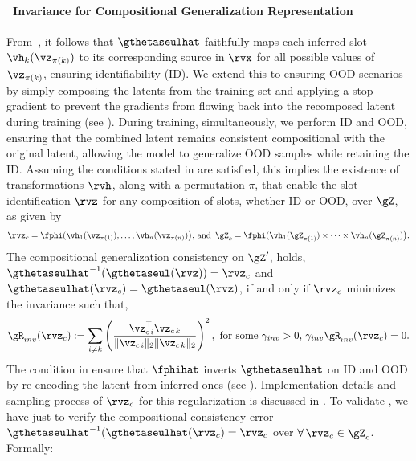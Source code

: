 \documentclass{article} %
\theoremstyle{plain}
\theoremstyle{definition}
\theoremstyle{remark}
\numberwithin{equation}{section}
\begin{document}
\paragraph{\ Invariance for Compositional Generalization Representation}
From~, it follows that \(\gthetaseulhat\) faithfully maps each inferred slot \(\vh_{k}(\vz_{\pi(k)})\) to its corresponding source in \(\rvx\) for all possible values of \(\vz_{\pi(k)}\), ensuring identifiability (ID). We extend this to ensuring OOD scenarios by simply composing the latents from the training set and applying a stop gradient to prevent the gradients from flowing back into the recomposed latent during training (see ). During training, simultaneously, we perform ID and OOD, ensuring that the combined latent remains consistent \ie compositional with the original latent, allowing the model to generalize OOD samples while retaining the ID.
Assuming the conditions stated in  are satisfied, this implies the existence of transformations \(\rvh\), along with a permutation \(\pi\), that enable the slot-identification $\rvz$ for any composition of slots, whether ID or OOD, over $\gZ$, as given by
\begin{equation}\label{eq:support_permutation}
    \rvz_{c} = \fphi( \vh_{1}(\vz_{\pi(1)}), \ldots, \vh_{n}(\vz_{\pi(n)}) \big),\, \text{and }\,
    \gZ_c = \fphi( \vh_{1}(\gZ_{\pi(1)})\times \cdots \times \vh_{n}(\gZ_{\pi(n)}) \big).
\end{equation}
The compositional generalization consistency on $\gZ'$, holds, \ie $\gthetaseulhat^{-1}(\gthetaseul(\rvz)) = \rvz_{c} $ and $\gthetaseulhat(\rvz_{c})=\gthetaseul(\rvz)$, if and only if $\rvz_{c}$ minimizes the invariance such that,
\begin{equation}\label{coro:compositional}
\gR_{inv}(\rvz_{c}) :=  \sum_{i \neq k} \left( \frac{\vz^{\top}_{c\,i} \vz_{c\,k}}{\|\vz_{c\,i}\|_2 \|\vz_{c\,k}\|_2} \right)^2, \text{ for some $\gamma_{inv}>0$, $\gamma_{inv}\gR_{inv}(\rvz_{c})=0$.}
\end{equation}
The condition in  ensure that $\fphihat$ inverts $\gthetaseulhat$ on ID and OOD by re-encoding the latent from inferred ones (see ). Implementation details and sampling process of $\rvz_{c}$ for this regularization is discussed in . To validate , we have just to verify the compositional consistency error \ie $\gthetaseulhat^{-1}(\gthetaseulhat(\rvz_{c})= \rvz_{c}$ over $\forall\,\rvz_{c}\in\gZ_c$. Formally:
\end{document}
